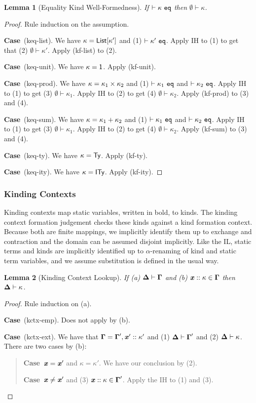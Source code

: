 \documentclass[12pt]{article}
\newtheorem{lemma}{Lemma}
\newcommand{\pfcase}[1]{\textbf{Case}~#1. }
\begin{document}
\begin{lemma}[Equality Kind Well-Formedness]
\label{lemma:equality-kind-well-formedness}
If $\vdash \kappa~\mathtt{eq}$ then $\emptyset \vdash \kappa$. 
\end{lemma}
\begin{proof} Rule induction on the assumption.

\pfcase{(keq-list)} We have $\kappa={\sf List}[\kappa']$ and (1) $\vdash \kappa'~\mathtt{eq}$. Apply IH to (1) to get that (2) $\emptyset \vdash \kappa'$. Apply (kf-list) to (2).

\pfcase{(keq-unit)} We have $\kappa={\sf 1}$. Apply (kf-unit).

\pfcase{(keq-prod)} We have $\kappa=\kappa_1\times\kappa_2$ and (1) $\vdash \kappa_1~\mathtt{eq}$ and $\vdash \kappa_2~\mathtt{eq}$. Apply IH to (1) to get (3) $\emptyset \vdash \kappa_1$. Apply IH to (2) to get (4) $\emptyset \vdash \kappa_2$. Apply (kf-prod) to (3) and (4).

\pfcase{(keq-sum)} We have $\kappa=\kappa_1+\kappa_2$ and (1) $\vdash \kappa_1~\mathtt{eq}$ and $\vdash \kappa_2~\mathtt{eq}$. Apply IH to (1) to get (3) $\emptyset \vdash \kappa_1$. Apply IH to (2) to get (4) $\emptyset \vdash \kappa_2$. Apply (kf-sum) to (3) and (4).

\pfcase{(keq-ty)} We have $\kappa={\sf Ty}$. Apply (kf-ty).

\pfcase{(keq-ity)} We have $\kappa={\sf ITy}$. Apply (kf-ity).
\end{proof}


\subsubsection{Kinding Contexts}
Kinding contexts map static variables, written in bold, to kinds. The kinding context formation judgement checks these kinds against a kind formation context. Because both are finite mappings, we implicitly identify them up to exchange and contraction and the domain can be assumed disjoint implicitly. Like the IL, static terms and kinds are implicitly identified up to $\alpha$-renaming of kind and static term variables, and we assume substitution is defined in the usual way.

\begin{lemma}[Kinding Context Lookup]
\label{lemma:kinding-context-lookup} If (a) $\boldsymbol\Delta \vdash \boldsymbol\Gamma$ and (b) ${\textbf{\textit{x}}} :: \kappa \in \boldsymbol\Gamma$ then $\boldsymbol\Delta \vdash \kappa$.\end{lemma}
\begin{proof} Rule induction on (a).

\pfcase{(kctx-emp)} Does not apply by (b).

\pfcase{(kctx-ext)} We have that $\boldsymbol\Gamma=\boldsymbol\Gamma', {\textbf{\textit{x}}}' :: \kappa'$ and (1) $\boldsymbol\Delta \vdash \boldsymbol\Gamma'$ and (2) $\boldsymbol\Delta \vdash \kappa$. There are two cases by (b):
\begin{quote}
\pfcase{${\textbf{\textit{x}}}={\textbf{\textit{x}}}'$ and $\kappa=\kappa'$} We have our conclusion by (2). 

\pfcase{${\textbf{\textit{x}}}\neq{\textbf{\textit{x}}}'$ and (3) ${\textbf{\textit{x}}} :: \kappa \in \boldsymbol\Gamma'$} Apply the IH to (1) and (3).
\end{quote}
\end{proof}
\end{document}
